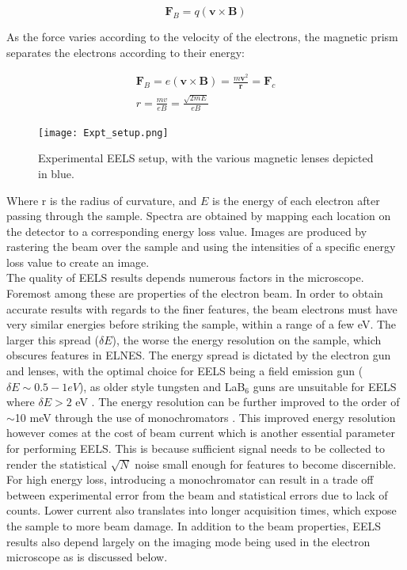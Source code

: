\begin{equation}
	\textbf{F}_B = q (\textbf{v} \times \textbf{B})
\end{equation}

As the force varies according to the velocity of the electrons, the magnetic prism  separates the electrons according to their energy: 

\begin{gather}
\textbf{F}_B = e (\textbf{v} \times \textbf{B}) =  \frac{m \textbf{v}^2}{\textbf{r}} = \textbf{F}_c \\
 r =  \frac{mv}{eB} = \frac{\sqrt{2mE}}{eB}
\end{gather}

\begin{figure}
 \centering
 \texttt{[image: Expt\_setup.png]}
 \caption{Experimental EELS setup, with the various magnetic lenses depicted in blue.  }
 \label{prism}
 
\end{figure}

Where  r is the radius of curvature, and $E$ is the energy of each electron after passing through the sample.  Spectra are obtained by mapping each location on the detector to a corresponding energy loss value. Images are produced by  rastering the beam over the sample and using the intensities of a specific energy loss value to create an image.\\ 

The quality of EELS results depends numerous factors in the microscope.  Foremost among these are properties of the electron beam.  In order to obtain accurate results with regards to the finer features, the beam electrons must have very similar energies before striking the sample, within a range of a few eV.  The larger this spread ($ \delta E $), the worse the energy resolution on the sample, which obscures features in ELNES.  The energy spread is dictated by the electron gun and lenses, with the optimal choice for EELS being a field emission gun ($\delta E \sim 0.5-1eV$), as older style tungsten and LaB$_6$ guns are unsuitable for EELS where $\delta E > 2 $ eV \cite{reimer_transmission_2008}.  The energy resolution can be further improved to the order of $\sim$10 meV through the use of monochromators \cite{hachtel_exploring_2018}.  This improved energy resolution however comes at the cost of beam current which is another essential parameter for performing EELS.  This is because sufficient signal needs to be collected to render the statistical $\sqrt{N}$ noise small enough for features to become discernible.  For high energy loss, introducing a monochromator can result in a trade off between experimental error from the beam and statistical errors due to lack of counts.  Lower current also translates into longer acquisition times, which expose the sample to more beam damage.  In addition to the beam properties, EELS results also depend largely on the imaging mode being used in the electron microscope as is discussed below.


